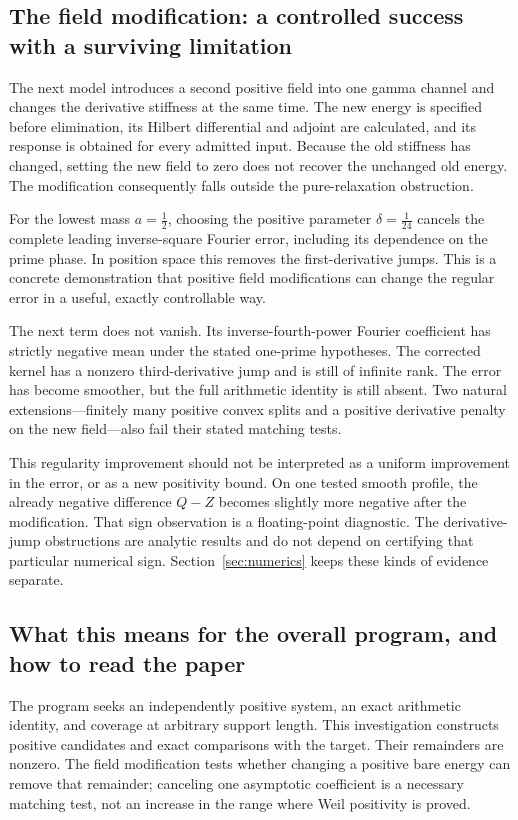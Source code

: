 \documentclass[11pt]{article}
\numberwithin{equation}{section}
\theoremstyle{definition}
\theoremstyle{remark}
\begin{document}
\subsection*{The field modification: a controlled success with a surviving limitation}
The next model introduces a second positive field into one gamma channel and changes the derivative stiffness at the same time. The new energy is specified before elimination, its Hilbert differential and adjoint are calculated, and its response is obtained for every admitted input. Because the old stiffness has changed, setting the new field to zero does not recover the unchanged old energy. The modification consequently falls outside the pure-relaxation obstruction.

For the lowest mass $a=\tfrac12$, choosing the positive parameter $\delta=\tfrac1{24}$ cancels the complete leading inverse-square Fourier error, including its dependence on the prime phase. In position space this removes the first-derivative jumps. This is a concrete demonstration that positive field modifications can change the regular error in a useful, exactly controllable way.

The next term does not vanish. Its inverse-fourth-power Fourier coefficient has strictly negative mean under the stated one-prime hypotheses. The corrected kernel has a nonzero third-derivative jump and is still of infinite rank. The error has become smoother, but the full arithmetic identity is still absent. Two natural extensions---finitely many positive convex splits and a positive derivative penalty on the new field---also fail their stated matching tests.

This regularity improvement should not be interpreted as a uniform improvement in the error, or as a new positivity bound. On one tested smooth profile, the already negative difference $Q-Z$ becomes slightly more negative after the modification. That sign observation is a floating-point diagnostic. The derivative-jump obstructions are analytic results and do not depend on certifying that particular numerical sign. Section~\ref{sec:numerics} keeps these kinds of evidence separate.

\subsection*{What this means for the overall program, and how to read the paper}
The program seeks an independently positive system, an exact arithmetic identity, and coverage at arbitrary support length. This investigation constructs positive candidates and exact comparisons with the target. Their remainders are nonzero. The field modification tests whether changing a positive bare energy can remove that remainder; canceling one asymptotic coefficient is a necessary matching test, not an increase in the range where Weil positivity is proved.
\end{document}
